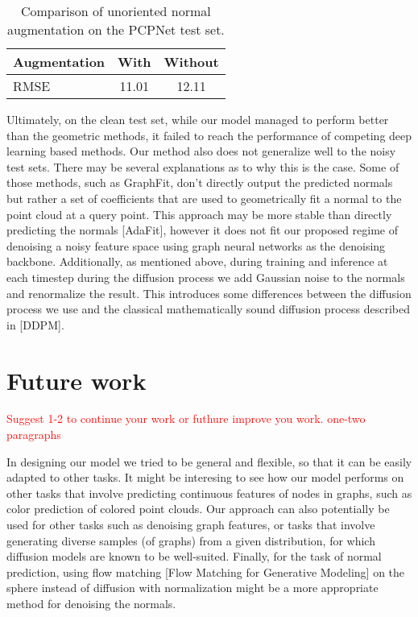 \documentclass{acmart}
\begin{document}
\begin{table}[ht]
  \centering
  \caption{Comparison of unoriented normal augmentation on the PCPNet test set.}
  \label{tab:augmentation_comparison}
  \begin{tabular}{lcc}
  \hline
  \textbf{Augmentation} & \textbf{With} & \textbf{Without} \\ \hline
  RMSE & 11.01 & 12.11 \\ \hline
  \end{tabular}
  \end{table}
Ultimately, on the clean test set, while our model managed to perform better than the geometric methods, it failed to reach the performance of competing deep learning based methods. Our method also does not generalize well to the noisy test sets. There may be several explanations as to why this is the case. Some of those methods, such as GraphFit, don't directly output the predicted normals but rather a set of coefficients that are used to geometrically fit a normal to the point cloud at a query point. This approach may be more stable than directly predicting the normals [AdaFit], however it does not fit our proposed regime of denoising a noisy feature space using graph neural networks as the denoising backbone. Additionally, as mentioned above, during training and inference at each timestep during the diffusion process we add Gaussian noise to the normals and renormalize the result. This introduces some differences between the diffusion process we use and the classical mathematically sound diffusion process described in [DDPM].


\section{Future work}
\textcolor{red}{Suggest 1-2 to continue your work or futhure improve you work.
one-two paragraphs}

In designing our model we tried to be general and flexible, so that it can be easily adapted to other tasks. It might be interesing to see how our model performs on other tasks that involve predicting continuous features of nodes in graphs, such as color prediction of colored point clouds. Our approach can also potentially be used for other tasks such as denoising graph features, or tasks that involve generating diverse samples (of graphs) from a given distribution, for which diffusion models are known to be well-suited.
Finally, for the task of normal prediction, using flow matching [Flow Matching for Generative Modeling] on the sphere instead of diffusion with normalization might be a more appropriate method for denoising the normals.
\end{document}
